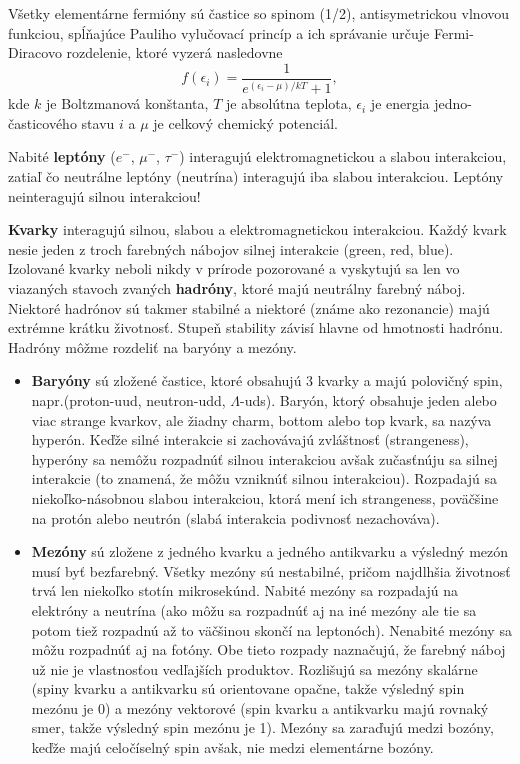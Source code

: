 \documentclass[../../main.tex]{subfiles}
\begin{document}
Všetky elementárne fermióny sú častice so spinom (1/2), antisymetrickou vlnovou funkciou, spĺňajúce Pauliho vylučovací princíp a ich správanie určuje Fermi-Diracovo rozdelenie, ktoré vyzerá nasledovne
\begin{equation}
f(\epsilon_i)=\frac{1}{e^{(\epsilon_i-\mu)/kT}+1},
\end{equation}
kde $k$ je Boltzmanová konštanta, $T$ je absolútna teplota, $\epsilon_i$ je energia jedno-časticového stavu $i$ a $\mu$ je celkový chemický potenciál.

Nabité \textbf{leptóny} ($e^{-}$, $\mu^{-}$, $\tau^{-}$) interagujú elektromagnetickou a slabou interakciou, zatiaľ čo neutrálne leptóny (neutrína) interagujú iba slabou interakciou. Leptóny neinteragujú silnou interakciou!

\textbf{Kvarky} interagujú silnou, slabou a elektromagnetickou interakciou. Každý kvark nesie jeden z troch farebných nábojov silnej interakcie (green, red, blue). Izolované kvarky neboli nikdy v prírode pozorované a vyskytujú sa len vo viazaných stavoch zvaných \textbf{hadróny}, ktoré majú neutrálny farebný náboj. Niektoré hadrónov sú takmer stabilné a niektoré (známe ako rezonancie) majú extrémne krátku životnosť. Stupeň stability závisí hlavne od hmotnosti hadrónu. Hadróny môžme rozdeliť na baryóny a mezóny. 

\begin{itemize}
\item \textbf{Baryóny} sú zložené častice, ktoré obsahujú 3 kvarky a majú polovičný spin, napr.(proton-uud, neutron-udd, $\Lambda$-uds). Baryón, ktorý obsahuje jeden alebo viac strange kvarkov, ale žiadny charm, bottom alebo top kvark, sa nazýva hyperón. Keďže silné interakcie si zachovávajú zvláštnosť (strangeness), hyperóny sa nemôžu rozpadnúť silnou interakciou avšak zučasťnúju sa silnej interakcie (to znamená, že môžu vzniknúť silnou interakciou). Rozpadajú sa niekoľko-násobnou slabou interakciou, ktorá mení ich strangeness, poväčšine na protón alebo neutrón (slabá interakcia podivnosť nezachováva).
\item \textbf{Mezóny} sú zložene z jedného kvarku a jedného antikvarku a výsledný mezón musí byť bezfarebný. Všetky mezóny sú nestabilné, pričom najdlhšia životnosť trvá len niekoľko stotín mikrosekúnd. Nabité mezóny sa rozpadajú na elektróny a neutrína (ako môžu sa rozpadnúť aj na iné mezóny ale tie sa potom tiež rozpadnú až to väčšinou skončí na leptonóch). Nenabité mezóny sa môžu rozpadnúť aj na fotóny. Obe tieto rozpady naznačujú, že farebný náboj už nie je vlastnosťou vedľajších produktov. Rozlišujú sa mezóny skalárne (spiny kvarku a antikvarku sú orientovane opačne, takže výsledný spin mezónu je 0) a mezóny vektorové (spin kvarku a antikvarku majú rovnaký smer, takže výsledný spin mezónu je 1). Mezóny sa zaraďujú medzi bozóny, keďže majú celočíselný spin avšak, nie medzi elementárne bozóny. 
\end{itemize}
\end{document}
